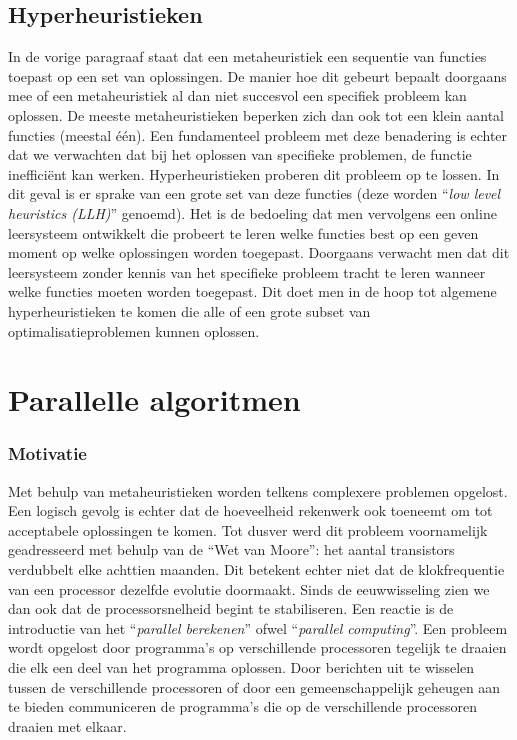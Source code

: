 \subsection{Hyperheuristieken}

In de vorige paragraaf staat dat een metaheuristiek een sequentie van functies toepast op een set van oplossingen. De manier hoe dit gebeurt bepaalt doorgaans mee of een metaheuristiek al dan niet succesvol een specifiek probleem kan oplossen. De meeste metaheuristieken beperken zich dan ook tot een klein aantal functies (meestal \'e\'en). Een fundamenteel probleem met deze benadering is echter dat we verwachten dat bij het oplossen van specifieke problemen, de functie ineffici\"ent kan werken. Hyperheuristieken proberen dit probleem op te lossen. In dit geval is er sprake van een grote set van deze functies (deze worden ``\emph{low level heuristics (LLH)}'' genoemd). Het is de bedoeling dat men vervolgens een online leersysteem ontwikkelt die probeert te leren welke functies best op een geven moment op welke oplossingen worden toegepast. Doorgaans verwacht men dat dit leersysteem zonder kennis van het specifieke probleem tracht te leren wanneer welke functies moeten worden toegepast. Dit doet men in de hoop 
tot algemene hyperheuristieken te komen die alle of een grote subset van optimalisatieproblemen kunnen oplossen.

\section{Parallelle algoritmen}

\subsubsection{Motivatie}

Met behulp van metaheuristieken worden telkens complexere problemen opgelost. Een logisch gevolg is echter dat de hoeveelheid rekenwerk ook toeneemt om tot acceptabele oplossingen te komen. Tot dusver werd dit probleem voornamelijk geadresseerd met behulp van de ``Wet van Moore''\cite{4785860}: het aantal transistors verdubbelt elke achttien maanden. Dit betekent echter niet dat de klokfrequentie van een processor dezelfde evolutie doormaakt. Sinds de eeuwwisseling zien we dan ook dat de processorsnelheid begint te stabiliseren. Een reactie is de introductie van het ``\emph{parallel berekenen}'' ofwel ``\emph{parallel computing}''. Een probleem wordt opgelost door programma's op verschillende processoren tegelijk te draaien die elk een deel van het programma oplossen. Door berichten uit te wisselen tussen de verschillende processoren of door een gemeenschappelijk geheugen aan te bieden communiceren de programma's die op de verschillende processoren draaien met elkaar.

